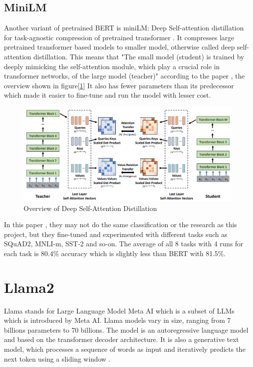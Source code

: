 \subsection{MiniLM}
Another variant of pretrained BERT is miniLM: Deep Self-attention distillation for task-agnostic compression of pretrained transformer \cite{Wang_Wei_Dong_Bao_Yang_Zhou_2020}.
It compresses large pretrained transformer based models to smaller model, otherwise called deep self-attention distillation. This means that "The small model (student) is trained by deeply mimicking the self-attention module, which play a crucial role in transformer networks, of the large model (teacher)" according to the paper \cite{Wang_Wei_Dong_Bao_Yang_Zhou_2020}, the overview shown in figure[\ref{fig:distillation}]
It also has fewer parameters than its predecessor which made it easier to fine-tune and run the model with lesser cost. 

\begin{figure}[ht]
    \centerline{\includegraphics[scale=.5]{Figures/deep_self-distillation.png}}
    \caption{Overview of Deep Self-Attention Distillation}
    \label{fig:distillation}
 \end{figure}

In this paper \cite{Wang_Wei_Dong_Bao_Yang_Zhou_2020}, they may not do the same classification or the research as this project, but they fine-tuned and experimented with different tasks such as SQuAD2, MNLI-m, SST-2 and so-on. The average of all 8 tasks with 4 runs for each task is 80.4\% accuracy which is slightly less than BERT with 81.5\%.


\section{Llama2}
Llama stands for Large Language Model Meta AI which is a subset of LLMs which is introduced by Meta AI. Llama models vary in size, ranging from 7 billions parameters to 70 billions. The model is an autoregressive language model and based on the transformer decoder architecture. It is also a generative text model, which processes a sequence of words as input and iteratively predicts the next token using a sliding window \cite{Iraqi_2023}.

